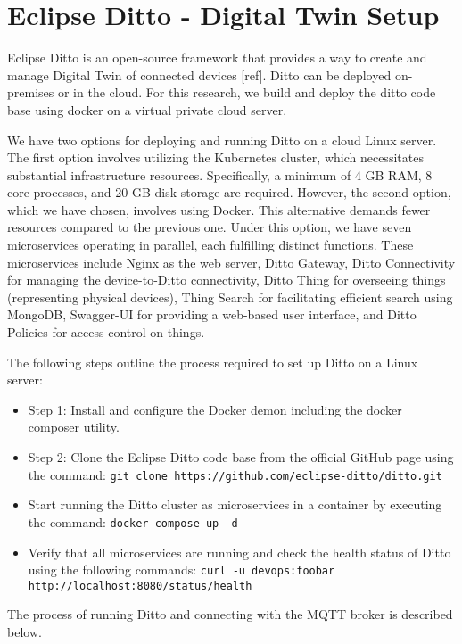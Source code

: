 

\section{Eclipse Ditto - Digital Twin Setup}
Eclipse Ditto is an open-source framework that provides a way to create and manage Digital Twin of connected devices [ref]. Ditto can be deployed on-premises or in the cloud. For this research, we build and deploy the ditto code base using docker on a virtual private cloud server. 


We have two options for deploying and running Ditto on a cloud Linux server. The first option involves utilizing the Kubernetes cluster, which necessitates substantial infrastructure resources. Specifically, a minimum of 4 GB RAM, 8 core processes, and 20 GB disk storage are required. However, the second option, which we have chosen, involves using Docker. This alternative demands fewer resources compared to the previous one. Under this option, we have seven microservices operating in parallel, each fulfilling distinct functions. These microservices include Nginx as the web server, Ditto Gateway, Ditto Connectivity for managing the device-to-Ditto connectivity, Ditto Thing for overseeing things (representing physical devices), Thing Search for facilitating efficient search using MongoDB, Swagger-UI for providing a web-based user interface, and Ditto Policies for access control on things.

The following steps outline the process required to set up Ditto on a Linux server:

\begin{itemize}
    \item Step 1: Install and configure the Docker demon including the docker composer utility.
    \item Step 2: Clone the Eclipse Ditto code base from the official GitHub page using the command: \texttt{git clone https://github.com/eclipse-ditto/ditto.git}
    \item Start running the Ditto cluster as microservices in a container by executing the command: \texttt{docker-compose up -d}
    \item Verify that all microservices are running and check the health status of Ditto using the following commands: \texttt{curl -u devops:foobar\\ http://localhost:8080/status/health}
\end{itemize}
The process of running Ditto and connecting with the MQTT broker is described below.


